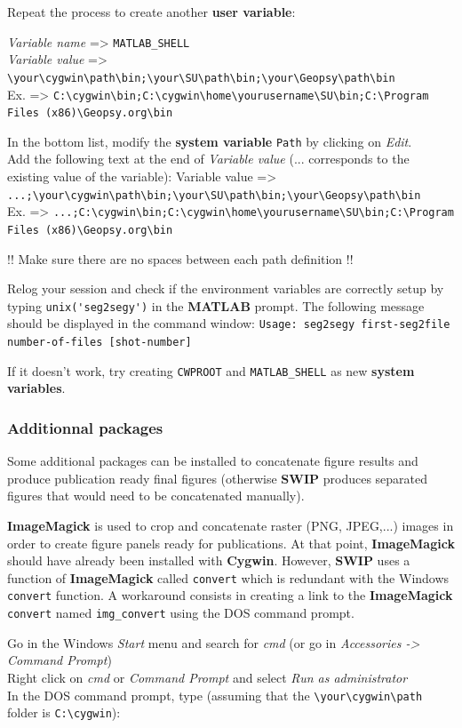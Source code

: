 \documentclass[twoside,a4paper]{article}
\def\SWIP{\textbf{SWIP}}
\def\SU{\textbf{SU}}
\def\Geopsy{\textbf{Geospy}}
\def\ImageMagick{\textbf{ImageMagick}}
\def\MATLAB{\textbf{MATLAB}}
\def\Cygwin{\textbf{Cygwin}}
\begin{document}
Repeat the process to create another \textbf{user variable}:

\textit{Variable name} => \verb|MATLAB_SHELL|\\
\textit{Variable value} => \verb|\your\cygwin\path\bin;\your\SU\path\bin;\your\Geopsy\path\bin|\\
Ex. => \verb|C:\cygwin\bin;C:\cygwin\home\yourusername\SU\bin;C:\Program Files (x86)\Geopsy.org\bin|

In the bottom list, modify the \textbf{system variable} \verb|Path| by clicking on \textit{Edit}.\\
Add the following text at the end of \textit{Variable value} (... corresponds to the existing value of the variable):
Variable value => \verb|...;\your\cygwin\path\bin;\your\SU\path\bin;\your\Geopsy\path\bin|\\
Ex. => \verb|...;C:\cygwin\bin;C:\cygwin\home\yourusername\SU\bin;C:\Program Files (x86)\Geopsy.org\bin|

!! Make sure there are no spaces between each path definition !!

Relog your session and check if the environment variables are correctly setup by typing \verb|unix('seg2segy')| in the {\MATLAB} prompt. The following message should be displayed in the command window: \verb|Usage: seg2segy first-seg2file number-of-files [shot-number]|

If it doesn't work, try creating \verb|CWPROOT| and \verb|MATLAB_SHELL| as new \textbf{system variables}.

\subsubsection{Additionnal packages}
\label{subsec:WinExtra}
Some additional packages can be installed to concatenate figure results and produce publication ready final figures (otherwise {\SWIP} produces separated figures that would need to be concatenated manually).

{\ImageMagick} is used to crop and concatenate raster (PNG, JPEG,...) images in order to create figure panels ready for publications. At that point, {\ImageMagick} should have already been installed with {\Cygwin}. However, {\SWIP} uses a function of {\ImageMagick} called \verb|convert| which is redundant with the Windows \verb|convert| function. A workaround consists in creating a link to the {\ImageMagick} \verb|convert| named \verb|img_convert| using the DOS command prompt.

Go in the Windows \textit{Start} menu and search for \textit{cmd} (or go in \textit{Accessories -> Command Prompt})\\
Right click on \textit{cmd} or \textit{Command Prompt} and select \textit{Run as administrator}\\
In the DOS command prompt, type (assuming that the \verb|\your\cygwin\path| folder is \verb|C:\cygwin|):
\end{document}
